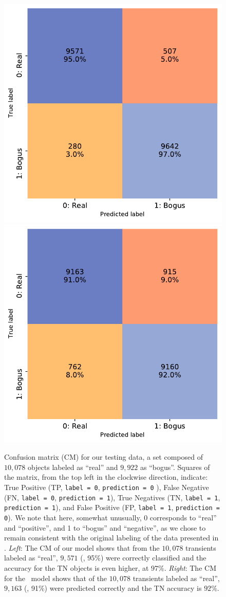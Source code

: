 \begin{figure}
    \centering
    \includegraphics[width=0.45\linewidth]{
    figures/confusionmatrix_model_100K20KNERSCstam0-9CCCC_3s3DH.pdf}
    \includegraphics[width=0.45\linewidth]{
    figures/confusionmatrix_model_100K20KNERSCstam0-9CCCC_3s2DH.pdf}
    \caption{Confusion matrix (CM) for our testing data, a set composed of $10,078$ objects labeled as ``real'' and $9,922$ as ``bogus''.  Squares of the matrix, from the top left in the clockwise direction, indicate: True Positive (TP, \texttt{label = 0}, \texttt{prediction = 0} ), False Negative (FN, \texttt{label = 0}, \texttt{prediction = 1}), True Negatives (TN, \texttt{label = 1}, \texttt{prediction = 1}), and False Positive (FP, \texttt{label = 1}, \texttt{prediction = 0}). We note that here, somewhat unusually, 0 corresponds to ``real'' and ``positive'', and 1 to ``bogus'' and ``negative'', as we chose to remain consistent with the original labeling of the data presented in \citep{Goldstein_2015}. 
    {\it Left}: The CM of our \textbf{\diabased } model shows that from the $10,078$ transients labeled as ``real'', $9,571$ (\ie, 95\%) were correctly classified and the accuracy for the TN objects is even higher, at $97\%$. {\it Right}: The CM for the \nodia\ model shows that of the $10,078$ transients labeled as ``real'', $9,163$ (\ie, 91\%) were predicted correctly and the TN accuracy is $92\%$. }
    \label{fig:confusiomatrix_models}
\end{figure}


